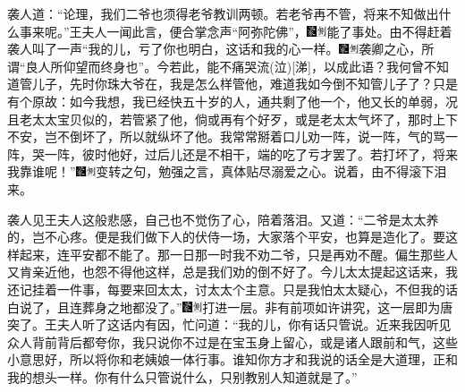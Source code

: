 袭人道：``论理，我们二爷也须得老爷教训两顿。若老爷再不管，将来不知做出什么事来呢。''王夫人一闻此言，便合掌念声``阿弥陀佛''，{\includegraphics[width=3mm]{../Images/00006}\includegraphics[width=3mm]{../Images/00011}\footnotesize \kaishu 能了事处。}由不得赶着袭人叫了一声``我的儿，亏了你也明白，这话和我的心一样。{\includegraphics[width=3mm]{../Images/00006}\includegraphics[width=3mm]{../Images/00011}\footnotesize \kaishu 袭卿之心，所谓``良人所仰望而终身也''。今若此，能不痛哭流{(泣)}{[}涕{]}，以成此语？}我何曾不知道管儿子，先时你珠大爷在，我是怎么样管他，难道我如今倒不知管儿子了？只是有个原故：如今我想，我已经快五十岁的人，通共剩了他一个，他又长的单弱，况且老太太宝贝似的，若管紧了他，倘或再有个好歹，或是老太太气坏了，那时上下不安，岂不倒坏了，所以就纵坏了他。我常常掰着口儿劝一阵，说一阵，气的骂一阵，哭一阵，彼时他好，过后儿还是不相干，端的吃了亏才罢了。若打坏了，将来我靠谁呢！''{\includegraphics[width=3mm]{../Images/00006}\includegraphics[width=3mm]{../Images/00011}\footnotesize \kaishu 变转之句，勉强之言，真体贴尽溺爱之心。}说着，由不得滚下泪来。

袭人见王夫人这般悲感，自己也不觉伤了心，陪着落泪。又道：``二爷是太太养的，岂不心疼。便是我们做下人的伏侍一场，大家落个平安，也算是造化了。要这样起来，连平安都不能了。那一日那一时我不劝二爷，只是再劝不醒。偏生那些人又肯亲近他，也怨不得他这样，总是我们劝的倒不好了。今儿太太提起这话来，我还记挂着一件事，每要来回太太，讨太太个主意。只是我怕太太疑心，不但我的话白说了，且连葬身之地都没了。''{\includegraphics[width=3mm]{../Images/00006}\includegraphics[width=3mm]{../Images/00011}\footnotesize \kaishu 打进一层。非有前项如许讲究，这一层即为唐突了。}王夫人听了这话内有因，忙问道：``我的儿，你有话只管说。近来我因听见众人背前背后都夸你，我只说你不过是在宝玉身上留心，或是诸人跟前和气，这些小意思好，所以将你和老姨娘一体行事。谁知你方才和我说的话全是大道理，正和我的想头一样。你有什么只管说什么，只别教别人知道就是了。''

